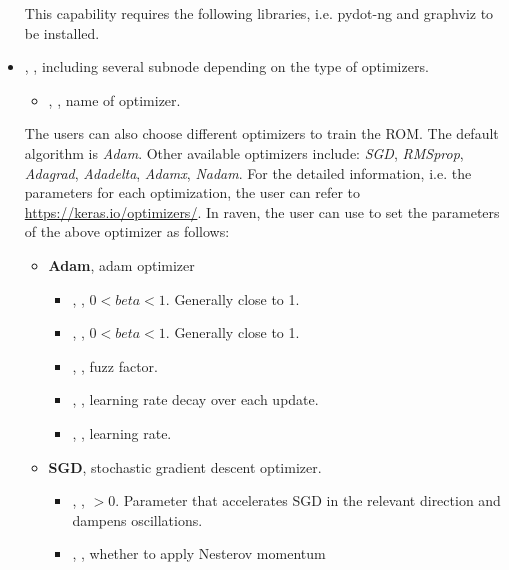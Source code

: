 \begin{itemize}
    \nb This capability requires the following libraries, i.e. pydot-ng and graphviz to be installed.
  \item {}, , including several subnode depending on the type of
    optimizers.
    \begin{itemize}
      \item {}, , name of optimizer.
    \end{itemize}
    \nb The users can also choose different optimizers to train the ROM. The default algorithm is \textit{Adam}.
    Other available optimizers include:
    \textit{SGD}, \textit{RMSprop}, \textit{Adagrad}, \textit{Adadelta}, \textit{Adamx}, \textit{Nadam}.
    For the detailed information, i.e. the parameters for each optimization, the user can refer to
    \url{https://keras.io/optimizers/}. In raven, the user can use  to set the
    parameters of the above optimizer as follows:
    \begin{itemize}
      \item \textbf{Adam}, adam optimizer
        \begin{itemize}
          \item {}, , $0 < beta < 1$. Generally close to 1.
          \item {}, , $0 < beta < 1$. Generally close to 1.
          \item {}, , fuzz factor.
          \item {}, , learning rate decay over each update.
          \item {}, , learning rate.
        \end{itemize}
      \item \textbf{SGD}, stochastic gradient descent optimizer.
        \begin{itemize}
          \item {}, , $> 0$. Parameter that accelerates SGD in
            the relevant direction and dampens oscillations.
          \item {}, , whether to apply Nesterov momentum

\end{itemize}
\end{itemize}
\end{itemize}
